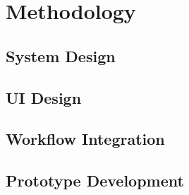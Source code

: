 \newpage
\section{Methodology} 

\subsection{System Design}
\subsection{UI Design}
\subsection{Workflow Integration}
\subsection{Prototype Development}
